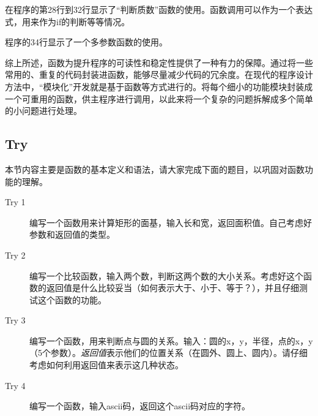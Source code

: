 在程序的第28行到32行显示了“判断质数”函数的使用。函数调用可以作为一个表达式，用来作为if的判断等等情况。

程序的34行显示了一个多参数函数的使用。

综上所述，函数为提升程序的可读性和稳定性提供了一种有力的保障。通过将一些常用的、重复的代码封装进函数，能够尽量减少代码的冗余度。在现代的程序设计方法中，“模块化”开发就是基于函数等方式进行的。将每个细小的功能模块封装成一个可重用的函数，供主程序进行调用，以此来将一个复杂的问题拆解成多个简单的小问题进行处理。

\subsection{Try}
本节内容主要是函数的基本定义和语法，请大家完成下面的题目，以巩固对函数功能的理解。
\begin{description}
	\item[Try 1]编写一个函数用来计算矩形的面基，输入长和宽，返回面积值。自己考虑好参数和返回值的类型。
	\item[Try 2]编写一个比较函数，输入两个数，判断这两个数的大小关系。考虑好这个函数的返回值是什么比较妥当（如何表示大于、小于、等于？），并且仔细测试这个函数的功能。
	\item[Try 3]编写一个函数，用来判断点与圆的关系。输入：圆的x，y，半径，点的x，y（5个参数）。\emph{返回值}表示他们的位置关系（在圆外、圆上、圆内）。请仔细考虑如何利用返回值来表示这几种状态。
	\item[Try 4]编写一个函数，输入ascii码，返回这个ascii码对应的字符。
\end{description}
